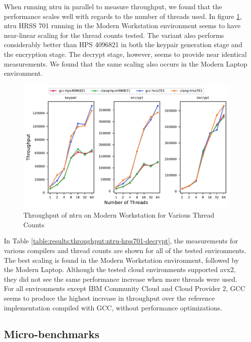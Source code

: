 When running \gls{ntru} in parallel to measure throughput, we found that the performance scales well with regards to the number of threads used. In figure \ref{figure:results:throughput:ntru-modern-workstation}, \gls{ntru} HRSS 701 running in the Modern Workstation environment seems to have near-linear scaling for the thread counts tested. The variant also performs considerably better than HPS 4096821 in both the keypair generation stage and the encryption stage. The decrypt stage, however, seems to provide near identical measurements. We found that the same scaling also occurs in the Modern Laptop environment.

\begin{figure}
    \centering
    \includegraphics[scale=0.75]{chapters/results/throughput/Modern Workstation_ntru.pdf}
    \caption{Throughput of \gls{ntru} on Modern Workstation for Various Thread Counts}
    \label{figure:results:throughput:ntru-modern-workstation}
\end{figure}

In Table \ref{table:results:throughput:ntru-hrss701-decrypt}, the measurements for various compilers and thread counts are shown for all of the tested environments. The best scaling is found in the Modern Workstation environment, followed by the Modern Laptop. Although the tested cloud environments supported \gls{avx2}, they did not see the same performance increase when more threads were used. For all environments except IBM Community Cloud and Cloud Provider 2, GCC seems to produce the highest increase in throughput over the reference implementation compiled with GCC, without performance optimizations.



\subsection{Micro-benchmarks}

